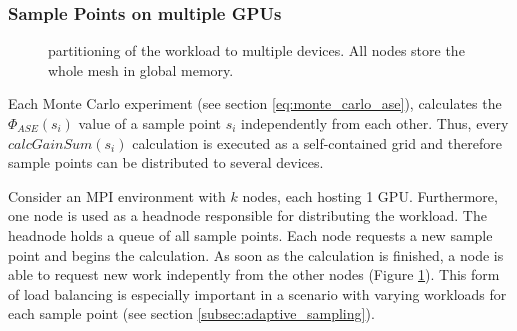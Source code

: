 \subsubsection{Sample Points on multiple GPUs}
\label{subsubsec:multigpu}
\begin{figure}[H]
  \centerline
  {}
  \caption{partitioning of the workload to multiple devices. All nodes store the whole mesh in
  global memory.}
  \label{graphic:multigpu}
\end{figure}

Each Monte Carlo experiment (see section \ref{eq:monte_carlo_ase}), calculates
the $\Phi_{ASE}(s_i)$ value of a sample point $s_i$ independently from each
other. Thus, every $calcGainSum(s_i)$ calculation is executed as a
self-contained grid and therefore sample points can be distributed to
several devices.

Consider an MPI\cite{MPI} environment with $k$ nodes, each hosting 1 GPU. Furthermore, one
node is used as a headnode responsible for distributing the workload. The
headnode holds a queue of all sample points. Each node requests a new sample
point and begins the calculation. As soon as the calculation is finished, a node
is able to request new work indepently from the other nodes (Figure
\ref{graphic:multigpu}). This form of load balancing is especially important in a
scenario with varying workloads for each sample point (see section
\ref{subsec:adaptive_sampling}).

